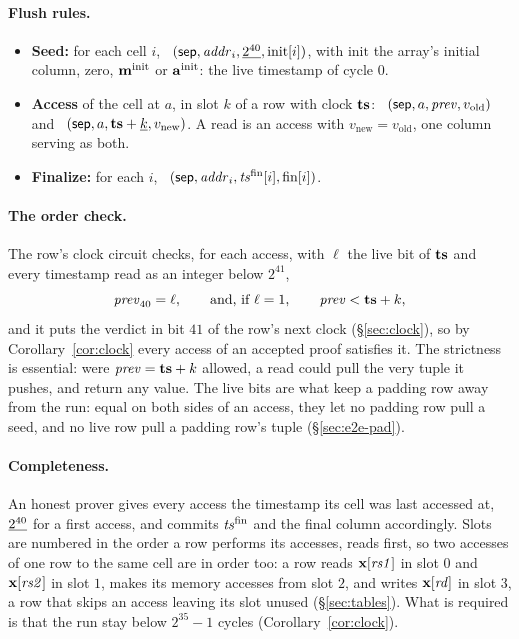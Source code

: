 \paragraph{Flush rules.}
\begin{itemize}
\item \textbf{Seed:} for each cell $i$, \push\ $( \mathsf{sep},\mathit{addr}_i,\underline{2^{40}},\mathrm{init}[i] )$, with $\mathrm{init}$ the array's initial column, zero, $\mathbf{m}^{\mathrm{init}}$ or $\mathbf{a}^{\mathrm{init}}$: the live timestamp of cycle $0$.
\item \textbf{Access} of the cell at $a$, in slot $k$ of a row with clock $\mathbf{ts}$: \pull\ $( \mathsf{sep},a,\mathit{prev},v_{\mathrm{old}} )$ and \push\ $( \mathsf{sep},a,\mathbf{ts}+\underline{k},v_{\mathrm{new}} )$. A read is an access with $v_{\mathrm{new}}=v_{\mathrm{old}}$, one column serving as both.
\item \textbf{Finalize:} for each $i$, \pull\ $( \mathsf{sep},\mathit{addr}_i,\mathit{ts}^{\mathrm{fin}}[i],\mathrm{fin}[i] )$.
\end{itemize}

\paragraph{The order check.} The row's clock circuit checks, for each access, with $\ell$ the live bit of $\mathbf{ts}$ and every timestamp read as an integer below $2^{41}$,
\begin{equation}\label{eq:order}
  \mathit{prev}_{40}=\ell,\qquad\text{and, if }\ell=1,\qquad \mathit{prev}<\mathbf{ts}+k ,
\end{equation}
and it puts the verdict in bit $41$ of the row's next clock (\S\ref{sec:clock}), so by Corollary~\ref{cor:clock} every access of an accepted proof satisfies it. The strictness is essential: were $\mathit{prev}=\mathbf{ts}+k$ allowed, a read could pull the very tuple it pushes, and return any value. The live bits are what keep a padding row away from the run: equal on both sides of an access, they let no padding row pull a seed, and no live row pull a padding row's tuple (\S\ref{sec:e2e-pad}).

\paragraph{Completeness.} An honest prover gives every access the timestamp its cell was last accessed at, $\underline{2^{40}}$ for a first access, and commits $\mathit{ts}^{\mathrm{fin}}$ and the final column accordingly. Slots are numbered in the order a row performs its accesses, reads first, so two accesses of one row to the same cell are in order too: a row reads $\mathbf{x}[\mathit{rs1}]$ in slot $0$ and $\mathbf{x}[\mathit{rs2}]$ in slot $1$, makes its memory accesses from slot $2$, and writes $\mathbf{x}[\mathit{rd}]$ in slot $3$, a row that skips an access leaving its slot unused (\S\ref{sec:tables}). What is required is that the run stay below $2^{35}-1$ cycles (Corollary~\ref{cor:clock}).

